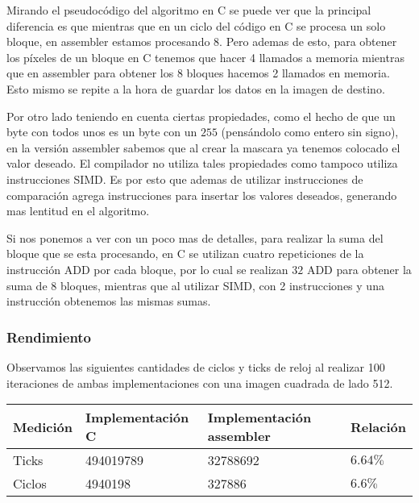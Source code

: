 Mirando el pseudocódigo del algoritmo en C se puede ver que la principal diferencia es que mientras que en un ciclo del código en C se procesa un solo bloque, en assembler estamos procesando 8. Pero ademas de esto, para obtener los píxeles de un bloque en C tenemos que hacer 4 llamados a memoria mientras que en assembler para obtener los 8 bloques hacemos 2 llamados en memoria.  Esto mismo se repite a la hora de guardar los datos en la imagen de destino.

Por otro lado teniendo en cuenta ciertas propiedades, como el hecho de que un byte con todos unos es un byte con un $255$ (pensándolo como entero sin signo), en la versión assembler sabemos que al crear la mascara ya tenemos colocado el valor deseado. El compilador no utiliza tales propiedades como tampoco utiliza instrucciones SIMD. Es por esto que ademas de utilizar instrucciones de comparación agrega instrucciones para insertar los valores deseados, generando mas lentitud en el algoritmo. 

Si nos ponemos a ver con un poco mas de detalles, para realizar la suma del bloque que se esta procesando, en C se utilizan cuatro repeticiones de la instrucción ADD por cada bloque, por lo cual se realizan $32$ ADD para obtener la suma de 8 bloques, mientras que al utilizar SIMD, con 2 instrucciones  y una instrucción  obtenemos las mismas sumas.

\subsubsection{Rendimiento}

Observamos las siguientes cantidades de ciclos y ticks de reloj al realizar 100 iteraciones de ambas implementaciones con una imagen cuadrada de lado 512.

\begin{center}
    \begin{tabular}{|l|l|l|l|}
        \hline
        Medición & Implementación C & Implementación assembler & Relación \\
        \hline
        Ticks    & 494019789      & 32788692               & $6.64\%$ \\
        Ciclos   & 4940198        & 327886                 & $6.6\%$ \\
        \hline
    \end{tabular}
\end{center}
